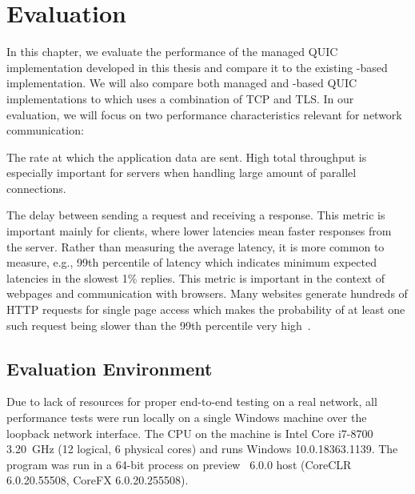 \chapter{Evaluation}\label{chap:04-evaluation}

In this chapter, we evaluate the performance of the managed QUIC implementation developed in this
thesis and compare it to the existing \libmsquic{}-based implementation. We will also compare both
managed and \libmsquic{}-based QUIC implementations to  which uses a combination of
TCP and TLS\@. In our evaluation, we will focus on two performance characteristics relevant for
network communication:

\begin{itemize}

         The rate at which the application data are sent. High total throughput is
        especially important for servers when handling large amount of parallel connections.

         The delay between sending a request and receiving a
        response. This metric is important mainly for clients, where lower latencies mean faster
        responses from the server. Rather than measuring the average latency, it is more common to
        measure, e.g., 99th percentile of latency which indicates minimum expected latencies in the
        slowest 1\% replies. This metric is important in the context of webpages and communication
        with browsers. Many websites generate hundreds of HTTP requests for single page access which
        makes the probability of at least one such request being slower than the 99th percentile
        very high~\cite{Treat2015}. 

\end{itemize}

\section{Evaluation Environment}

Due to lack of resources for proper end-to-end testing on a real network, all performance tests were
run locally on a single Windows machine over the loopback network interface. The CPU on the machine
is Intel Core i7-8700 \SI{3.20}{\giga\hertz} (12 logical, 6 physical cores) and runs Windows
10.0.18363.1139. The program was run in a 64-bit process on preview \dotnet{}~6.0.0 host
(CoreCLR 6.0.20.55508, CoreFX 6.0.20.255508).


